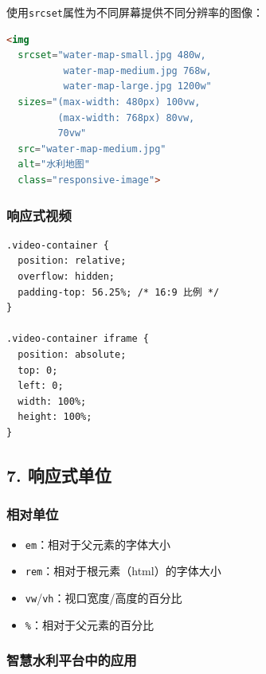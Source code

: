 使用\passthrough{\lstinline!srcset!}属性为不同屏幕提供不同分辨率的图像：

\begin{lstlisting}[language=HTML]
<img 
  srcset="water-map-small.jpg 480w,
          water-map-medium.jpg 768w,
          water-map-large.jpg 1200w"
  sizes="(max-width: 480px) 100vw,
         (max-width: 768px) 80vw,
         70vw"
  src="water-map-medium.jpg"
  alt="水利地图"
  class="responsive-image">
\end{lstlisting}

\subsubsection{响应式视频}\label{ux54cdux5e94ux5f0fux89c6ux9891}

\begin{lstlisting}
.video-container {
  position: relative;
  overflow: hidden;
  padding-top: 56.25%; /* 16:9 比例 */
}

.video-container iframe {
  position: absolute;
  top: 0;
  left: 0;
  width: 100%;
  height: 100%;
}
\end{lstlisting}

\subsection{7. 响应式单位}\label{ux54cdux5e94ux5f0fux5355ux4f4d}

\subsubsection{相对单位}\label{ux76f8ux5bf9ux5355ux4f4d}

\begin{itemize}
\tightlist
\item
  \passthrough{\lstinline!em!}：相对于父元素的字体大小
\item
  \passthrough{\lstinline!rem!}：相对于根元素（html）的字体大小
\item
  \passthrough{\lstinline!vw!}/\passthrough{\lstinline!vh!}：视口宽度/高度的百分比
\item
  \passthrough{\lstinline!\%!}：相对于父元素的百分比
\end{itemize}

\subsubsection{智慧水利平台中的应用}\label{ux667aux6167ux6c34ux5229ux5e73ux53f0ux4e2dux7684ux5e94ux7528}

